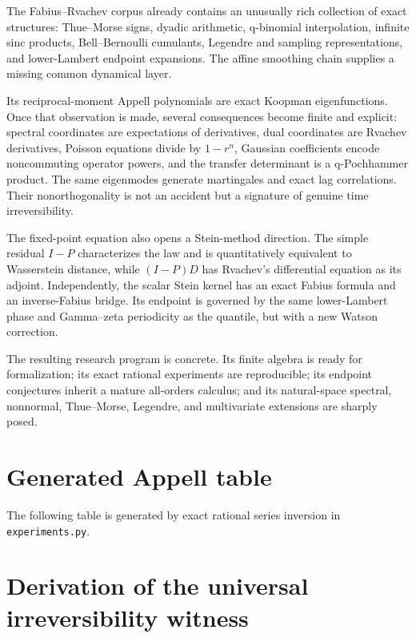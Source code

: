 \documentclass[11pt,a4paper]{article}
\theoremstyle{definition}
\theoremstyle{remark}
\begin{document}
The Fabius--Rvachev corpus already contains an unusually rich collection of exact structures: Thue--Morse signs, dyadic arithmetic, q-binomial interpolation, infinite sinc products, Bell--Bernoulli cumulants, Legendre and sampling representations, and lower-Lambert endpoint expansions. The affine smoothing chain supplies a missing common dynamical layer.

Its reciprocal-moment Appell polynomials are exact Koopman eigenfunctions. Once that observation is made, several consequences become finite and explicit: spectral coordinates are expectations of derivatives, dual coordinates are Rvachev derivatives, Poisson equations divide by $1-r^n$, Gaussian coefficients encode noncommuting operator powers, and the transfer determinant is a q-Pochhammer product. The same eigenmodes generate martingales and exact lag correlations. Their nonorthogonality is not an accident but a signature of genuine time irreversibility.

The fixed-point equation also opens a Stein-method direction. The simple residual $I-P$ characterizes the law and is quantitatively equivalent to Wasserstein distance, while $(I-P)D$ has Rvachev's differential equation as its adjoint. Independently, the scalar Stein kernel has an exact Fabius formula and an inverse-Fabius bridge. Its endpoint is governed by the same lower-Lambert phase and Gamma--zeta periodicity as the quantile, but with a new Watson correction.

The resulting research program is concrete. Its finite algebra is ready for formalization; its exact rational experiments are reproducible; its endpoint conjectures inherit a mature all-orders calculus; and its natural-space spectral, nonnormal, Thue--Morse, Legendre, and multivariate extensions are sharply posed.

\appendix

\section{Generated Appell table}
\label{app:appell-table}

The following table is generated by exact rational series inversion in \texttt{experiments.py}.



\section{Derivation of the universal irreversibility witness}
\label{app:G24}
\end{document}
